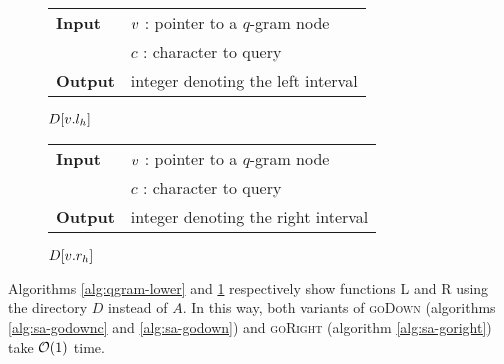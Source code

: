 \begin{figure*}[b!]
\begin{minipage}[b]{.5\textwidth}
\begin{algorithm}[H]
\begin{tabular}{ll}
\textbf{Input}  & $v$ : pointer to a $q$-gram node\\
				& $c$ : character to query\\
\textbf{Output} & integer denoting the left interval\\
\end{tabular}
\begin{algorithmic}[1]
\State \Return $D[v.l_h]$
\end{algorithmic}
\label{alg:qgram-lower}
\end{algorithm}
\end{minipage}
\hfill
\begin{minipage}[b]{.5\textwidth}
\begin{algorithm}[H]
\begin{tabular}{ll}
\textbf{Input}  & $v$ : pointer to a $q$-gram node\\
				& $c$ : character to query\\
\textbf{Output} & integer denoting the right interval\\
\end{tabular}
\begin{algorithmic}[1]
\State \Return $D[v.r_h]$
\end{algorithmic}
\label{alg:qgram-upper}
\end{algorithm}
\end{minipage}
\end{figure*}

Algorithms \ref{alg:qgram-lower} and \ref{alg:qgram-upper} respectively show functions \textsc{L} and \textsc{R} using the directory $D$ instead of $A$.
In this way, both variants of \textsc{goDown} (algorithms \ref{alg:sa-godownc} and \ref{alg:sa-godown}) and \textsc{goRight} (algorithm \ref{alg:sa-goright}) take $\mathcal{O}(1)$ time.

